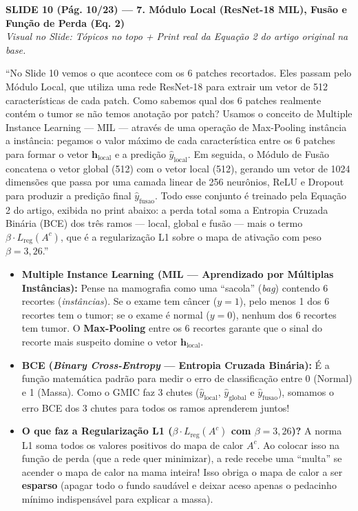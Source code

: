 \documentclass[11pt,a4paper]{article}
\newcommand{\slideheader}[3]{%
    \vspace{10pt}%
    \begin{tcolorbox}[colback=slateborder, colframe=slateborder, coltext=white, boxrule=0pt, arc=3pt, left=8pt, right=8pt, top=5pt, bottom=5pt]
        {\large\bfseries #1 — #2}\\[2pt]
        {\small\itshape Visual no Slide: #3}
    \end{tcolorbox}%
}
\newenvironment{falabox}{%
    \begin{tcolorbox}[colback=speechbg, colframe=speechborder, boxrule=1.2pt, arc=4pt, left=10pt, right=10pt, top=8pt, bottom=8pt, title={\bfseries O QUE VOCÊ DEVE FALAR (Fala Sugerida)}]%
}{%
    \end{tcolorbox}%
}
\newenvironment{explicabox}{%
    \begin{tcolorbox}[colback=explainbg, colframe=explainborder, boxrule=0.8pt, arc=4pt, left=10pt, right=10pt, top=8pt, bottom=8pt, title={\bfseries ENTENDA O QUE VOCÊ ESTÁ FALANDO (Explicação Didática de Cada Termo)}]%
}{%
    \end{tcolorbox}%
}
\begin{document}
\newpage
\slideheader{SLIDE 10 (Pág. 10/23)}{7. Módulo Local (ResNet-18 MIL), Fusão e Função de Perda (Eq. 2)}{Tópicos no topo + Print real da Equação 2 do artigo original na base.}

\begin{falabox}
``No Slide 10 vemos o que acontece com os 6 patches recortados. Eles passam pelo Módulo Local, que utiliza uma rede ResNet-18 para extrair um vetor de 512 características de cada patch. Como sabemos qual dos 6 patches realmente contém o tumor se não temos anotação por patch? Usamos o conceito de Multiple Instance Learning — MIL — através de uma operação de Max-Pooling instância a instância: pegamos o valor máximo de cada característica entre os 6 patches para formar o vetor $\mathbf{h}_{\text{local}}$ e a predição $\hat{y}_{\text{local}}$. Em seguida, o Módulo de Fusão concatena o vetor global (512) com o vetor local (512), gerando um vetor de 1024 dimensões que passa por uma camada linear de 256 neurônios, ReLU e Dropout para produzir a predição final $\hat{y}_{\text{fusao}}$. Todo esse conjunto é treinado pela Equação 2 do artigo, exibida no print abaixo: a perda total soma a Entropia Cruzada Binária (BCE) dos três ramos — local, global e fusão — mais o termo $\beta \cdot L_{\text{reg}}(A^c)$, que é a regularização L1 sobre o mapa de ativação com peso $\beta = 3{,}26$.''
\end{falabox}

\begin{explicabox}
\begin{itemize}[leftmargin=*, itemsep=4pt]
    \item \textbf{Multiple Instance Learning (MIL — Aprendizado por Múltiplas Instâncias):} Pense na mamografia como uma ``sacola'' (\textit{bag}) contendo 6 recortes (\textit{instâncias}). Se o exame tem câncer ($y=1$), pelo menos 1 dos 6 recortes tem o tumor; se o exame é normal ($y=0$), nenhum dos 6 recortes tem tumor. O \textbf{Max-Pooling} entre os 6 recortes garante que o sinal do recorte mais suspeito domine o vetor $\mathbf{h}_{\text{local}}$.
    \item \textbf{BCE (\textit{Binary Cross-Entropy} — Entropia Cruzada Binária):} É a função matemática padrão para medir o erro de classificação entre 0 (Normal) e 1 (Massa). Como o GMIC faz 3 chutes ($\hat{y}_{\text{local}}$, $\hat{y}_{\text{global}}$ e $\hat{y}_{\text{fusao}}$), somamos o erro BCE dos 3 chutes para todos os ramos aprenderem juntos!
    \item \textbf{O que faz a Regularização L1 ($\beta \cdot L_{\text{reg}}(A^c)$ com $\beta = 3{,}26$)?} A norma L1 soma todos os valores positivos do mapa de calor $A^c$. Ao colocar isso na função de perda (que a rede quer minimizar), a rede recebe uma ``multa'' se acender o mapa de calor na mama inteira! Isso obriga o mapa de calor a ser \textbf{esparso} (apagar todo o fundo saudável e deixar aceso apenas o pedacinho mínimo indispensável para explicar a massa).
\end{itemize}
\end{explicabox}
\end{document}
